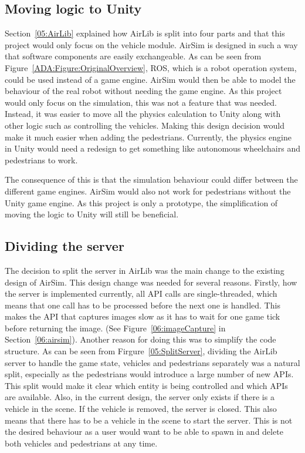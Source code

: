 \subsection{Moving logic to Unity}
Section~\ref{05:AirLib} explained how AirLib is split into four parts and that this project would only focus on the vehicle module. AirSim is designed in such a way that software components are easily exchangeable. As can be seen from Figure~\ref{ADA:Figure:OriginalOverview}, ROS, which is a robot operation system, could be used instead of a game engine. AirSim would then be able to model the behaviour of the real robot without needing the game engine. As this project would only focus on the simulation, this was not a feature that was needed. Instead, it was easier to move all the physics calculation to Unity along with other logic such as controlling the vehicles. Making this design decision would make it much easier when adding the pedestrians. Currently, the physics engine in Unity would need a redesign to get something like autonomous wheelchairs and pedestrians to work.

The consequence of this is that the simulation behaviour could differ between the different game engines. AirSim would also not work for pedestrians without the Unity game engine. As this project is only a prototype, the simplification of moving the logic to Unity will still be beneficial. 

\subsection{Dividing the server} \label{05:dividingServer}
The decision to split the server in AirLib was the main change to the existing design of AirSim. This design change was needed for several reasons. Firstly, how the server is implemented currently, all API calls are single-threaded, which means that one call has to be processed before the next one is handled. This makes the API that captures images slow as it has to wait for one game tick before returning the image. (See Figure~\ref{06:imageCapture} in Section~\ref{06:airsim}). Another reason for doing this was to simplify the code structure. As can be seen from Firgure~\ref{05:SplitServer}, dividing the AirLib server to handle the game state, vehicles and pedestrians separately was a natural split, especially as the pedestrians would introduce a large number of new APIs. This split would make it clear which entity is being controlled and which APIs are available. Also, in the current design, the server only exists if there is a vehicle in the scene. If the vehicle is removed, the server is closed. This also means that there has to be a vehicle in the scene to start the server.  This is not the desired behaviour as a user would want to be able to spawn in and delete both vehicles and pedestrians at any time. 

